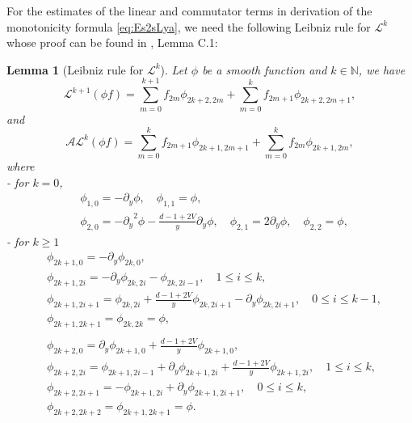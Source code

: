 \documentclass[11pt]{aims}
\newtheorem{lemma}[theorem]{Lemma}
\theoremstyle{definition}
\numberwithin{equation}{section}
\begin{document}
For the estimates of the linear and commutator terms in derivation of the monotonicity formula \eqref{eq:Es2sLya}, we need the following Leibniz rule for ${\mathscr{L}}^k$ whose proof can be found in \cite{IGN16}, Lemma C.1:

\begin{lemma}[Leibniz rule for ${\mathscr{L}}^k$] \label{lemm:LeibnizLk}  Let $\phi$ be a smooth function and $k \in \mathbb{N}$, we have 
\begin{equation}\label{eq:LeibnizLk}
{\mathscr{L}}^{k + 1}(\phi f) = \sum_{m = 0}^{k+1}f_{2m}\phi_{2k+2, 2m} + \sum_{m = 0}^k f_{2m + 1}\phi_{2k + 2, 2m + 1},
\end{equation}
and 
\begin{equation}\label{eq:LeibnizALk}
{\mathscr{A}}{\mathscr{L}}^{k}(\phi f) = \sum_{m = 0}^{k}f_{2m + 1}\phi_{2k+1, 2m + 1} + \sum_{m = 0}^k f_{2m}\phi_{2k+1, 2m},
\end{equation}
where\\
- for $k = 0$,
\begin{align*}
&\phi_{1,0} = -{\partial_y} \phi, \quad \phi_{1,1} = \phi,\\
&\phi_{2,0} = -{\partial_y}^2 \phi - \frac{d-1 +2V}{y}{\partial_y} \phi, \quad \phi_{2,1}= 2{\partial_y} \phi, \quad \phi_{2,2} = \phi,
\end{align*}
- for $k \geq 1$
\begin{align*}
&\phi_{2k + 1, 0} = -{\partial_y} \phi_{2k,0},\\
&\phi_{2k + 1, 2i} = - {\partial_y} \phi_{2k, 2i} - \phi_{2k, 2i - 1}, \quad 1 \leq i \leq k,\\
&\phi_{2k+1, 2i + 1}= \phi_{2k, 2i} + \frac{d-1 + 2V}{y}\phi_{2k, 2i + 1} - {\partial_y}\phi_{2k, 2i+1}, \quad 0 \leq i \leq k-1,\\
&\phi_{2k + 1, 2k + 1} = \phi_{2k, 2k} = \phi,\\
& \quad\\
&\phi_{2k + 2, 0} = {\partial_y} \phi_{2k+1,0} + \frac{d-1 + 2V}{y}\phi_{2k+1, 0},\\
&\phi_{2k + 2, 2i} = \phi_{2k + 1, 2i - 1} + {\partial_y} \phi_{2k + 1, 2i} + \frac{d-1 + 2V}{y}\phi_{2k + 1, 2i},\quad 1 \leq i \leq k,\\
&\phi_{2k+2, 2i + 1}= -\phi_{2k + 1,2i} + {\partial_y}\phi_{2k+1, 2i + 1}, \quad 0 \leq i \leq k,\\
&\phi_{2k + 2, 2k + 2} = \phi_{2k + 1, 2k + 1} = \phi.
\end{align*}
\end{lemma}
\end{document}
